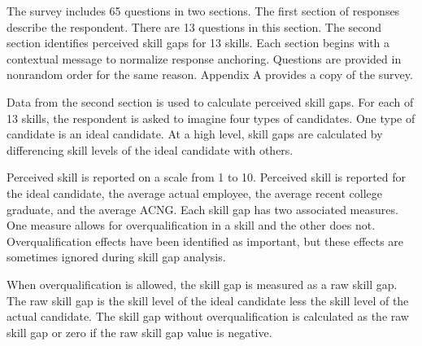 \documentclass[review]{elsarticle}
\begin{document}
The survey includes 65 questions in two sections.
The first section of responses describe the respondent.
There are 13 questions in this section.
The second section identifies perceived skill gaps for 13 skills.
Each section begins with a contextual message to normalize response anchoring.
Questions are provided in nonrandom order for the same reason.
Appendix A provides a copy of the survey.


Data from the second section is used to calculate perceived skill gaps.
For each of 13 skills, the respondent is asked to imagine four types of candidates.
One type of candidate is an ideal candidate.
At a high level, skill gaps are calculated by differencing skill levels of the ideal candidate with others.

Perceived skill is reported on a scale from 1 to 10.
Perceived skill is reported for the ideal candidate,
the average actual employee,
the average recent college graduate,
and the average ACNG.
Each skill gap has two associated measures.
One measure allows for overqualification in a skill and the other does not.
Overqualification effects have been identified as important\cite{green2007there, raybould2005over}, but these effects are sometimes ignored during skill gap analysis\cite{blake_2018}.

When overqualification is allowed, the skill gap is measured as a raw skill gap.
The raw skill gap is the skill level of the ideal candidate less the skill level of the actual candidate.
The skill gap without overqualification is calculated as the raw skill gap or zero if the raw skill gap value is negative.
\end{document}
